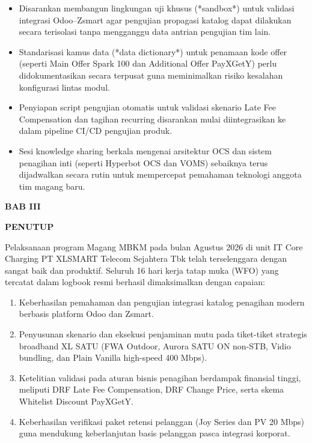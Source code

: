 \documentclass[12pt,a4paper]{article}
\begin{document}
\vspace{0.4cm}
\vspace{0.1cm}
\begin{itemize}[label=\textbullet,leftmargin=1.5em,itemsep=2pt,topsep=1pt]
    \item Disarankan membangun lingkungan uji khusus (*sandbox*) untuk validasi integrasi Odoo--Zsmart agar pengujian propagasi katalog dapat dilakukan secara terisolasi tanpa mengganggu data antrian pengujian tim lain.
    \item Standarisasi kamus data (*data dictionary*) untuk penamaan kode offer (seperti Main Offer Spark 100 dan Additional Offer PayXGetY) perlu didokumentasikan secara terpusat guna meminimalkan risiko kesalahan konfigurasi lintas modul.
    \item Penyiapan script pengujian otomatis untuk validasi skenario Late Fee Compensation dan tagihan recurring disarankan mulai diintegrasikan ke dalam pipeline CI/CD pengujian produk.
    \item Sesi knowledge sharing berkala mengenai arsitektur OCS dan sistem penagihan inti (seperti Hyperbot OCS dan VOMS) sebaiknya terus dijadwalkan secara rutin untuk mempercepat pemahaman teknologi anggota tim magang baru.
\end{itemize}

\clearpage
\begin{center}
    {\bfseries\large BAB III\par}
    {\bfseries\large PENUTUP\par}
\end{center}
\vspace{0.3cm}

\vspace{0.2cm}
Pelaksanaan program Magang MBKM pada bulan Agustus 2026 di unit IT Core Charging PT XLSMART Telecom Sejahtera Tbk telah terselenggara dengan sangat baik dan produktif. Seluruh 16 hari kerja tatap muka (WFO) yang tercatat dalam logbook resmi berhasil dimaksimalkan dengan capaian:
\begin{enumerate}[label=\arabic*.,leftmargin=1.5em,itemsep=2pt,topsep=2pt]
    \item Keberhasilan pemahaman dan pengujian integrasi katalog penagihan modern berbasis platform Odoo dan Zsmart.
    \item Penyusunan skenario dan eksekusi penjaminan mutu pada tiket-tiket strategis broadband XL SATU (FWA Outdoor, Aurora SATU ON non-STB, Vidio bundling, dan Plain Vanilla high-speed 400 Mbps).
    \item Ketelitian validasi pada aturan bisnis penagihan berdampak finansial tinggi, meliputi DRF Late Fee Compensation, DRF Change Price, serta skema Whitelist Discount PayXGetY.
    \item Keberhasilan verifikasi paket retensi pelanggan (Joy Series dan PV 20 Mbps) guna mendukung keberlanjutan basis pelanggan pasca integrasi korporat.
\end{enumerate}
\end{document}
